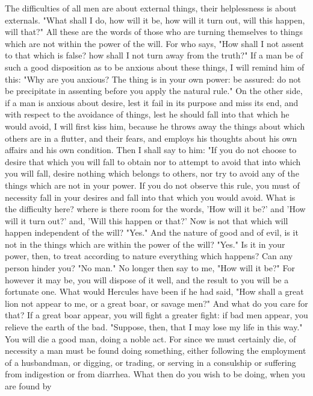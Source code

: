\documentclass[a4paper]{article}
\begin{document}
    The difficulties of all men are about external things, their helplessness
is about externals. "What shall I do, how will it be, how will it turn out,
will this happen, will that?" All these are the words of those who are turning
themselves to things which are not within the power of the will. For who says,
"How shall I not assent to that which is false? how shall I not turn away from
the truth?" If a man be of such a good disposition as to be anxious about these
things, I will remind him of this: "Why are you anxious? The thing is in your
own power: be assured: do not be precipitate in assenting before you apply the
natural rule." On the other side, if a man is anxious about desire, lest it
fail in its purpose and miss its end, and with respect to the avoidance of
things, lest he should fall into that which he would avoid, I will first kiss
him, because he throws away the things about which others are in a flutter, and
their fears, and employs his thoughts about his own affairs and his own
condition. Then I shall say to him: "If you do not choose to desire that which
you will fall to obtain nor to attempt to avoid that into which you will fall,
desire nothing which belongs to others, nor try to avoid any of the things
which are not in your power. If you do not observe this rule, you must of
necessity fall in your desires and fall into that which you would avoid. What
is the difficulty here? where is there room for the words, 'How will it be?'
and 'How will it turn out?' and, 'Will this happen or that?'
    Now is not that which will happen independent of the will? "Yes." And the
nature of good and of evil, is it not in the things which are within the power
of the will? "Yes." Is it in your power, then, to treat according to nature
everything which happens? Can any person hinder you? "No man." No longer then
say to me, "How will it be?" For however it may be, you will dispose of it
well, and the result to you will be a fortunate one. What would Hercules have
been if he had said, "How shall a great lion not appear to me, or a great boar,
or savage men?" And what do you care for that? If a great boar appear, you will
fight a greater fight: if bad men appear, you relieve the earth of the bad.
"Suppose, then, that I may lose my life in this way." You will die a good man,
doing a noble act. For since we must certainly die, of necessity a man must be
found doing something, either following the employment of a husbandman, or
digging, or trading, or serving in a consulship or suffering from indigestion
or from diarrhea. What then do you wish to be doing, when you are found by
\end{document}
